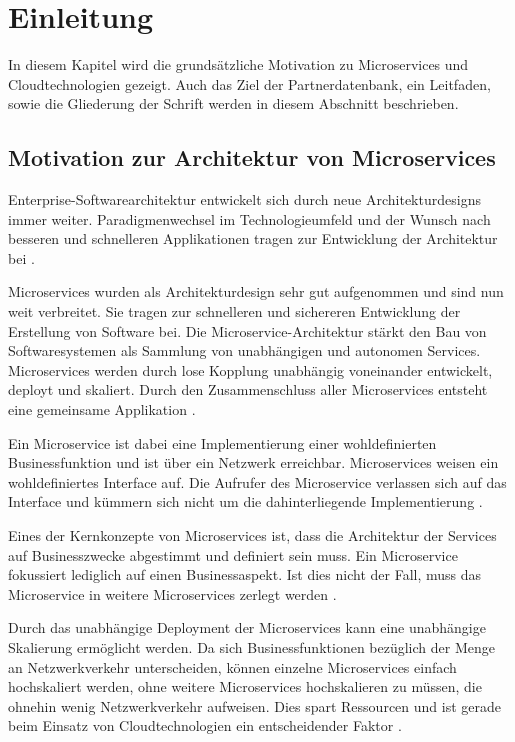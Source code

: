 \chapter{Einleitung}
In diesem Kapitel wird die grundsätzliche Motivation zu Microservices und Cloudtechnologien gezeigt. Auch das Ziel der Partnerdatenbank, ein Leitfaden, sowie die Gliederung der Schrift werden in diesem Abschnitt beschrieben.

\section{Motivation zur Architektur von Microservices}
Enterprise-Softwarearchitektur entwickelt sich durch neue Architekturdesigns immer weiter. Paradigmenwechsel im Technologieumfeld und der Wunsch nach besseren und schnelleren Applikationen tragen zur Entwicklung der Architektur bei \cite{MicroservicesForTheEnterprise}.

Microservices wurden als Architekturdesign sehr gut aufgenommen und sind nun weit verbreitet. Sie tragen zur schnelleren und sichereren Entwicklung der Erstellung von Software bei. Die Microservice-Architektur stärkt den Bau von Softwaresystemen als Sammlung von unabhängigen und autonomen Services. Microservices werden durch lose Kopplung unabhängig voneinander entwickelt, deployt und skaliert. Durch den Zusammenschluss aller Microservices entsteht eine gemeinsame Applikation \cite{MicroservicesForTheEnterprise}.

Ein Microservice ist dabei eine Implementierung einer wohldefinierten Businessfunktion und ist über ein Netzwerk erreichbar. Microservices weisen ein wohldefiniertes Interface auf. Die Aufrufer des Microservice verlassen sich auf das Interface und kümmern sich nicht um die dahinterliegende Implementierung \cite{MicroservicesForTheEnterprise}.

Eines der Kernkonzepte von Microservices ist, dass die Architektur der Services auf Businesszwecke abgestimmt und definiert sein muss. Ein Microservice fokussiert lediglich auf einen Businessaspekt. Ist dies nicht der Fall, muss das Microservice in weitere Microservices zerlegt werden \cite{MicroservicesForTheEnterprise}.

Durch das unabhängige Deployment der Microservices kann eine unabhängige Skalierung ermöglicht werden. Da sich Businessfunktionen bezüglich der Menge an Netzwerkverkehr unterscheiden, können einzelne Microservices einfach hochskaliert werden, ohne weitere Microservices hochskalieren zu müssen, die ohnehin wenig Netzwerkverkehr aufweisen. Dies spart Ressourcen und ist gerade beim Einsatz von Cloudtechnologien ein entscheidender Faktor \cite{MicroservicesForTheEnterprise}.


